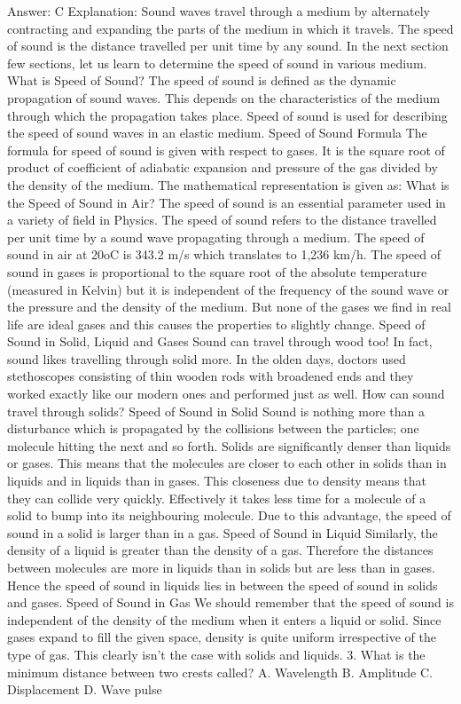Answer: C
Explanation: Sound waves travel through a medium by alternately contracting and expanding the parts of the medium in which it travels. The speed of sound is the distance travelled per unit time by any sound. In the next section few sections, let us learn to determine the speed of sound in various medium. What is Speed of Sound? The speed of sound is defined as the dynamic propagation of sound waves. This depends on the characteristics of the medium through which the propagation takes place. Speed of sound is used for describing the speed of sound waves in an elastic medium. Speed of Sound Formula The formula for speed of sound is given with respect to gases. It is the square root of product of coefficient of adiabatic expansion and pressure of the gas divided by the density of the medium. The mathematical representation is given as: What is the Speed of Sound in Air? The speed of sound is an essential parameter used in a variety of field in Physics. The speed of sound refers to the distance travelled per unit time by a sound wave propagating through a medium. The speed of sound in air at 20oC is 343.2 m/s which translates to 1,236 km/h. The speed of sound in gases is proportional to the square root of the absolute temperature (measured in Kelvin) but it is independent of the frequency of the sound wave or the pressure and the density of the medium. But none of the gases we find in real life are ideal gases and this causes the properties to slightly change. Speed of Sound in Solid, Liquid and Gases Sound can travel through wood too! In fact, sound likes travelling through solid more. In the olden days, doctors used stethoscopes consisting of thin wooden rods with broadened ends and they worked exactly like our modern ones and performed just as well. How can sound travel through solids? Speed of Sound in Solid Sound is nothing more than a disturbance which is propagated by the collisions between the particles; one molecule hitting the next and so forth. Solids are significantly denser than liquids or gases. This means that the molecules are closer to each other in solids than in liquids and in liquids than in gases. This closeness due to density means that they can collide very quickly. Effectively it takes less time for a molecule of a solid to bump into its neighbouring molecule. Due to this advantage, the speed of sound in a solid is larger than in a gas. Speed of Sound in Liquid Similarly, the density of a liquid is greater than the density of a gas. Therefore the distances between molecules are more in liquids than in solids but are less than in gases. Hence the speed of sound in liquids lies in between the speed of sound in solids and gases. Speed of Sound in Gas We should remember that the speed of sound is independent of the density of the medium when it enters a liquid or solid. Since gases expand to fill the given space, density is quite uniform irrespective of the type of gas. This clearly isn’t the case with solids and liquids. 3. What is the minimum distance between two crests called? A. Wavelength B. Amplitude C. Displacement D. Wave pulse 

